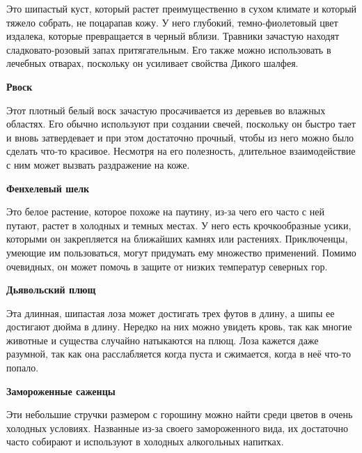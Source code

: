 \documentclass[a4paper, 9pt, twocolumn]{book}
\begin{document}
	\noindent Это шипастый куст, который растет преимущественно в сухом климате и который тяжело собрать, не поцарапав кожу. У него глубокий, темно-фиолетовый цвет издалека, которые превращается в черный вблизи. Травники зачастую находят сладковато-розовый запах притягательным. Его также можно использовать в лечебных отварах, поскольку он усиливает свойства Дикого шалфея.
	
	\medspace
	
	\noindent \textbf{Рвоск}
	
	\smallskip
	
	\noindent Этот плотный белый воск зачастую просачивается из деревьев во влажных областях. Его обычно используют при создании свечей, поскольку он быстро тает и вновь затвердевает и при этом достаточно прочный, чтобы из него можно было сделать что-то красивое. Несмотря на его полезность, длительное взаимодействие с ним может вызвать раздражение на коже.
	
	\medspace
	
	\noindent \textbf{Фенхелевый шелк}
	
	\smallskip
	
	Это белое растение, которое похоже на паутину, из-за чего его часто с ней путают, растет в холодных и темных местах. У него есть крочкообразные усики, которыми он закрепляется на ближайших камнях или растениях. Приключенцы, умеющие им пользоваться, могут придумать ему множество применений. Помимо очевидных, он может помочь в защите от низких температур северных гор.
	
	\medspace
	
	\noindent \textbf{Дьявольский плющ}
	
	\smallskip
	
	\noindent Эта длинная, шипастая лоза может достигать трех футов в длину, а шипы ее достигают дюйма в длину. Нередко на них можно увидеть кровь, так как многие животные и существа случайно натыкаются на плющ. Лоза кажется даже разумной, так как она расслабляется когда пуста и сжимается, когда в неё что-то попало.
	
	\medspace
	
	\noindent \textbf{Замороженные саженцы}
	
	\smallskip
	
	\noindent Эти небольшие стручки размером с горошину можно найти среди цветов в очень холодных условиях. Названные из-за своего замороженного вида, их достаточно часто собирают и используют в холодных алкогольных напитках.
	
	\medspace
	
\end{document}
